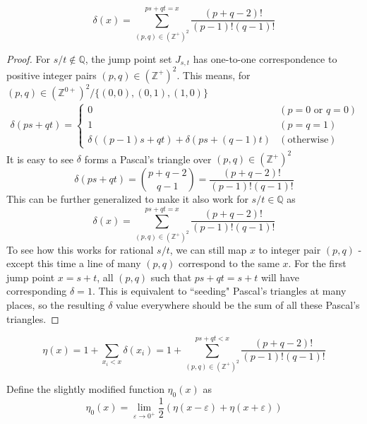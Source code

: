 \documentclass[]{article}
\begin{document}
\vspace{1cm}
\begin{lemma}
	\[
	\delta(x) = \sum_{(p,q)\in(\mathbb{Z}^+)^2}^{ps+qt = x} \frac{(p+q-2)!}{(p-1)!(q-1)!}
	\]
\end{lemma}
\begin{proof}
	For $s/t\notin\mathbb{Q}$, the jump point set $J_{s,t}$ has one-to-one correspondence to positive integer pairs $(p,q)\in(\mathbb{Z}^+)^2$. This means, for $(p,q)\in(\mathbb{Z}^{0+})^2 / \{(0,0), (0,1), (1,0)\}$
	\begin{align*}
		\delta(ps+qt) = \begin{cases}
			0 & (p= 0 \text{ or } q = 0) \\
			1 & (p = q = 1) \\
			\delta((p-1)s+qt) + \delta(ps+(q-1)t) & (\text{otherwise})
		\end{cases}
	\end{align*}
	It is easy to see $\delta$ forms a Pascal's triangle over $(p,q)\in(\mathbb{Z}^+)^2$
	\[
	\delta(ps+qt) = \binom{p+q-2}{q-1} = \frac{(p+q-2)!}{(p-1)!(q-1)!}
	\]
	This can be further generalized to make it also work for $s/t\in\mathbb{Q}$ as
	\[
	\delta(x) = \sum_{(p,q)\in(\mathbb{Z}^+)^2}^{ps+qt = x} \frac{(p+q-2)!}{(p-1)!(q-1)!}
	\]
	To see how this works for rational $s/t$, we can still map $x$ to integer pair $(p, q)$ - except this time a line of many $(p, q)$ correspond to the same $x$. For the first jump point $x = s + t$, all $(p, q)$ such that $ps + qt = s + t$ will have corresponding $\delta = 1$. This is equivalent to ``seeding" Pascal's triangles at many places, so the resulting $\delta$ value everywhere should be the sum of all these Pascal's triangles.
	
\end{proof}


\vspace{1cm}
\begin{lemma}
	\[
	\eta(x) = 1 + \sum_{x_i < x} \delta(x_i) = 1 + \sum_{(p,q)\in(\mathbb{Z}^+)^2}^{ps+qt < x} \frac{(p+q-2)!}{(p-1)!(q-1)!}
	\]
\end{lemma}

\vspace{1cm}
\begin{definition}
	Define the slightly modified function $\eta_0(x)$ as 
	\[
	\eta_0(x) = \lim_{\varepsilon\to 0^+} \frac{1}{2}(\eta(x-\varepsilon) + \eta(x+\varepsilon))
	\]
\end{definition}
\end{document}
